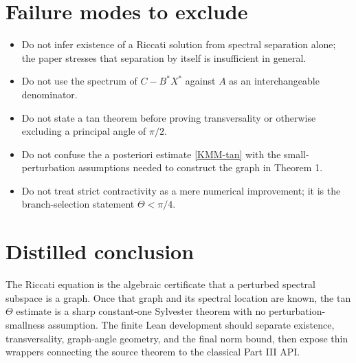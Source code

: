 \section{Failure modes to exclude}

\begin{itemize}[leftmargin=2em]
\item Do not infer existence of a Riccati solution from spectral separation alone; the paper stresses that separation by itself is insufficient in general.
\item Do not use the spectrum of $C-B^*X^*$ against $A$ as an interchangeable denominator.
\item Do not state a tan theorem before proving transversality or otherwise excluding a principal angle of $\pi/2$.
\item Do not confuse the a posteriori estimate \eqref{KMM-tan} with the small-perturbation assumptions needed to construct the graph in Theorem 1.
\item Do not treat strict contractivity as a mere numerical improvement; it is the branch-selection statement $\Theta<\pi/4$.
\end{itemize}

\section*{Distilled conclusion}

The Riccati equation is the algebraic certificate that a perturbed spectral subspace is a graph. Once that graph and its spectral location are known, the tan $\Theta$ estimate is a sharp constant-one Sylvester theorem with no perturbation-smallness assumption. The finite Lean development should separate existence, transversality, graph-angle geometry, and the final norm bound, then expose thin wrappers connecting the source theorem to the classical Part III API.


